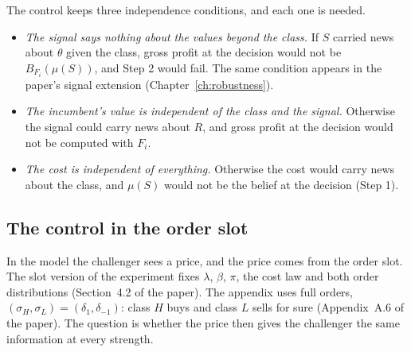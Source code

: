 \begin{watchout}
The control keeps three independence conditions, and each one is needed.
\begin{itemize}
\item \emph{The signal says nothing about the values beyond the class.} If \(S\) carried news about \(\theta\) given
  the class, gross profit at the decision would not be \(B_{F_i}(\mu(S))\), and Step 2 would fail. The same
  condition appears in the paper's signal extension (Chapter~\ref{ch:robustness}).
\item \emph{The incumbent's value is independent of the class and the signal.} Otherwise the signal could carry news about
  \(R\), and gross profit at the decision would not be computed with \(F_i\).
\item \emph{The cost is independent of everything.} Otherwise the cost would carry news about the class, and
  \(\mu(S)\) would not be the belief at the decision (Step 1).
\end{itemize}
\end{watchout}

\subsection{The control in the order slot}\label{sec:example-slot}

In the model the challenger sees a price, and the price comes from the order slot. The slot version of the
experiment fixes \(\lambda\), \(\beta\), \(\pi\), the cost law and both order distributions (Section~4.2 of the
paper). The appendix uses full orders, \((\sigma_H,\sigma_L)=(\delta_1,\delta_{-1})\): class \(H\) buys and class
\(L\) sells for sure (Appendix~A.6 of the paper). The question is whether the price then gives the challenger the
same information at every strength.

